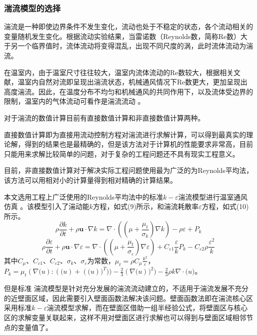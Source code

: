 		\subsubsection{湍流模型的选择}
湍流是一种即使边界条件不发生变化，流动也处于不稳定的状态，各个流动相关的变量随机发生变化。根据流动实验结果，当雷诺数（Reynolds数，简称Re数）大于另一个临界值时，流体流动将变得混乱，出现不同尺度的涡，此时流体流动为湍流。

在温室内，由于温室尺寸往往较大，温室内流体流动的Re数较大，根据相关文献，温室内自然对流即呈现出湍流状态，机械通风情况下Re数更大，更加呈现出高度湍流。因此，在温度分布不均匀和机械通风的共同作用下，以及流体受边界的限制，温室内的气体流动可看作是湍流流动\supercite{WangFujun2004} 。

对于湍流的数值计算目前有直接数值计算和非直接数值计算两种。

直接数值计算即为直接用流动控制方程对湍流进行求解计算，可以得到最真实的理论解，得到的结果也是最精确的，但是该方法对于计算机的性能要求非常高，目前只能用来求解比较简单的问题，对于复杂的工程问题还不具有现实工程意义。

目前，非直接数值计算对于解决实际工程问题使用最为广泛的为Reynolds平均法，该方法可以用相对小的计算量得到相对精确的计算结果。

本文选用工程上广泛使用的Reynolds平均法中的标准$k-\varepsilon$湍流模型进行温室通风仿真\supercite{Sase2004,RenShougang2015,WuFeiqing2010} 。该模型引入了湍动能$k$方程，如式(9)所示，和湍流耗散率$\varepsilon$方程，如式(10)所示。
	\begin{equation}
		\label{eqn:k}
		\rho \frac{\partial k}{\partial t}+\rho \mathbf{u} \cdot \nabla k = \nabla \cdot ((\mu + \frac{\mu_t}{\sigma_k}) \nabla k) -\rho \varepsilon +P_k
	\end{equation}
	\begin{equation}
		\label{eqn:e}
		\rho \frac{\partial \varepsilon}{\partial t}+\rho \mathbf{u} \cdot \nabla \varepsilon = \nabla \cdot ((\mu + \frac{\mu_t}{\sigma_{\varepsilon}}) \nabla \varepsilon ) +C_{\varepsilon 1} \frac{\varepsilon}{k} P_k - C_{\varepsilon 2} \rho \frac{\varepsilon^2}{k}
	\end{equation}
其中$C_{\mu}$、$C_{\varepsilon 1}$、$C_{\varepsilon 2}$、$\sigma_k$、$\sigma_{\varepsilon}$为常数，$\mu_t =\rho C_{\mu} \frac{k^2}{\varepsilon}$，
$P_k=\mu_t(\nabla \mathbf(u):(\mathbf(u)+(\mathbf(u))^T))-\frac{2}{3}(\nabla \mathbf(u))^2)-\frac{2}{3}\rho k \nabla \cdot \mathbf(u)$。

但是标准 湍流模型是针对充分发展的湍流流动建立的，不适用于湍流发展不充分的近壁面区域，因此需要引入壁面函数法解决该问题\supercite{WangFujun2004}。壁面函数法即在湍流核心区采用标准$k-\varepsilon$湍流模型求解，而在壁面区借助一组半经验公式，将壁面区与核心区的求解变量关联起来，这样不用对壁面区进行求解也可以得到与壁面区域相邻节点的变量值了。
